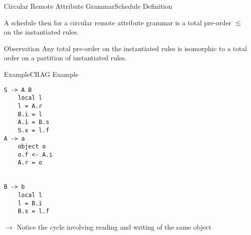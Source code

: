 \begin{frame}{Circular Remote Attribute Grammar}{Schedule Definition}
    
\begin{definition}
A schedule then for a circular remote attribute grammar is a \alert{total pre-order} $\lesssim$ on the \alert{instantiated rules}.
\end{definition}

\begin{exampleblock}{Observation}
Any total pre-order on the instantiated rules is isomorphic to a total order on a partition of instantiated rules.
\end{exampleblock}

\end{frame}




\begin{frame}[fragile=singleslide]{Example}{CRAG Example}

\begin{multicols}{3}
\begin{Verbatim}[fontsize=\small]
S -> A B
    local l
    l = A.r
    B.i = l
    A.i = B.s
    S.x = l.f
A -> a
    object o
    o.f <- A.i
    A.r = o


B -> b
    local l
    l = B.i
    B.s = l.f
\end{Verbatim}
\end{multicols}

\newlinevspace

$\to$ Notice the \alert{cycle} involving reading and writing of the same object

\end{frame}




